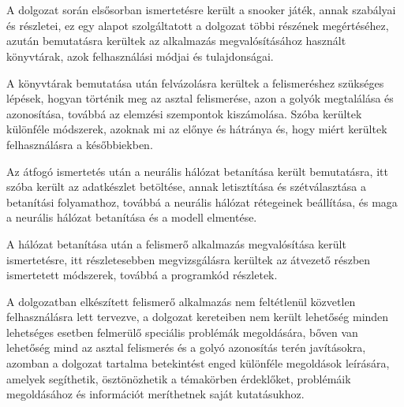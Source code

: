 \chapter*{\osszefoglalas}
A dolgozat során elsősorban ismertetésre került a snooker játék, annak szabályai és részletei, ez egy alapot szolgáltatott a dolgozat többi részének megértéséhez, azután bemutatásra kerültek az alkalmazás megvalósításához használt könyvtárak, azok felhasználási módjai és tulajdonságai.
\par A könyvtárak bemutatása után felvázolásra kerültek a felismeréshez szükséges lépések, hogyan történik meg az asztal felismerése, azon a golyók megtalálása és azonosítása, továbbá az elemzési szempontok kiszámolása. Szóba kerültek különféle módszerek, azoknak mi az előnye és hátránya és, hogy miért kerültek felhasználásra a későbbiekben.
\par Az átfogó ismertetés után a neurális hálózat betanítása került bemutatásra, itt szóba került az adatkészlet betöltése, annak letisztítása és szétválasztása a betanítási folyamathoz, továbbá a neurális hálózat rétegeinek beállítása, és maga a neurális hálózat betanítása és a modell elmentése.
\par A hálózat betanítása után a felismerő alkalmazás megvalósítása került ismertetésre, itt részletesebben megvizsgálásra kerültek az átvezető részben ismertetett módszerek, továbbá a programkód részletek.
\par A dolgozatban elkészített felismerő alkalmazás nem feltétlenül közvetlen felhasználásra lett tervezve, a dolgozat kereteiben nem került lehetőség minden lehetséges esetben felmerülő speciális problémák megoldására, bőven van lehetőség mind az asztal felismerés és a golyó azonosítás terén javításokra, azomban a dolgozat tartalma betekintést enged különféle megoldások leírására, amelyek segíthetik, ösztönözhetik a témakörben érdeklőket, problémáik megoldásához és információt meríthetnek saját kutatásukhoz.